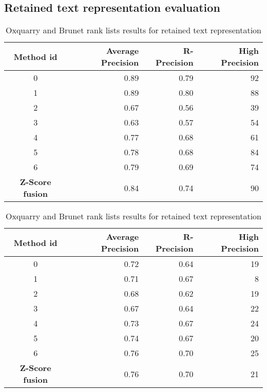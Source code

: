 \newpage
\subsection{Retained text representation evaluation \label{sec:annex_retained_text_representation}}

\begin{table}[H]
  \centering
  \caption{Oxquarry and Brunet rank lists results for retained text representation}
  \label{tab:9rl_results_brunet_oxquarry}

  \begin{tabular}{c r r r}
    \toprule
    Method id &
    Average Precision &
    R-Precision &
    High Precision \\
    \midrule
    0 & 0.89 & 0.79 & 92 \\
    1 & 0.89 & 0.80 & 88 \\
    2 & 0.67 & 0.56 & 39 \\
    3 & 0.63 & 0.57 & 54 \\
    4 & 0.77 & 0.68 & 61 \\
    5 & 0.78 & 0.68 & 84 \\
    6 & 0.79 & 0.69 & 74 \\
    \textbf{Z-Score fusion} &  0.84 & 0.74 & 90 \\
    \bottomrule
  \end{tabular}

  \vspace{0.5cm}

  \begin{tabular}{c r r r}
    \toprule
    Method id &
    Average Precision &
    R-Precision &
    High Precision \\
    \midrule
    0 & 0.72 & 0.64 & 19 \\
    1 & 0.71 & 0.67 &  8 \\
    2 & 0.68 & 0.62 & 19 \\
    3 & 0.67 & 0.64 & 22 \\
    4 & 0.73 & 0.67 & 24 \\
    5 & 0.74 & 0.67 & 20 \\
    6 & 0.76 & 0.70 & 25 \\
    \textbf{Z-Score fusion} & 0.76 &  0.70 & 21 \\
    \bottomrule
  \end{tabular}

\end{table}


